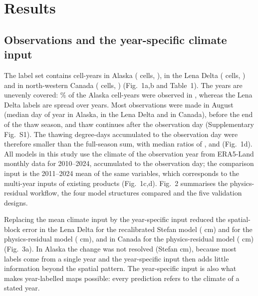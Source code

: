 \section{Results}\label{sec:results}

\subsection{Observations and the year-specific climate input}
The label set contains \nncyAk{} cell-years in Alaska (\nncellAk{} cells, \nyrsAk), \nncyLe{} in the Lena Delta (\nncellLe{} cells, \nyrsLe) and \nncyCa{} in north-western Canada (\nncellCa{} cells, \nyrsCa) (Fig.~1a,b and Table~1). The years are unevenly covered: \ntopyrshareAk{}\% of the Alaska cell-years were observed in \ntopyrAk, whereas the Lena Delta labels are spread over \nnyrLe{} years. Most observations were made in August (median day of year \ndoymedAk{} in Alaska, \ndoymedLe{} in the Lena Delta and \ndoymedCa{} in Canada), before the end of the thaw season, and thaw continues after the observation day (Supplementary Fig.~S1). The thawing degree-days accumulated to the observation day were therefore smaller than the full-season sum, with median ratios of \ntddfracAk, \ntddfracLe{} and \ntddfracCa{} (Fig.~1d). All models in this study use the climate of the observation year from ERA5-Land monthly data for 2010--2024, accumulated to the observation day; the comparison input is the 2011--2024 mean of the same variables, which corresponds to the multi-year inputs of existing products (Fig.~1c,d). Fig.~2 summarises the physics-residual workflow, the four model structures compared and the five validation designs.

Replacing the mean climate input by the year-specific input reduced the spatial-block error in the Lena Delta for the recalibrated Stefan model (\ndforcLePo{} cm) and for the physics-residual model (\ndforcLeRo{} cm), and in Canada for the physics-residual model (\ndforcCaRo{} cm) (Fig.~3a). In Alaska the change was not resolved (Stefan \ndforcAkPo{} cm), because most labels come from a single year and the year-specific input then adds little information beyond the spatial pattern. The year-specific input is also what makes year-labelled maps possible: every prediction refers to the climate of a stated year.

